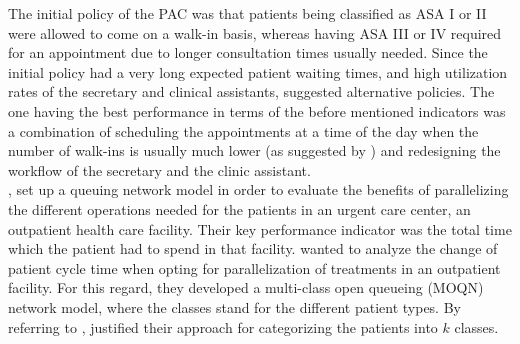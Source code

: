 \documentclass[11pt,a4paper]{article}
\begin{document}
\begin{spacing}{1.8}
The initial policy of the PAC was that patients being classified as ASA I or II were allowed to come on a walk-in basis, whereas having ASA III or IV required for an appointment due to longer consultation times usually needed.
Since the initial policy had a very long expected patient waiting times, and high utilization rates of the secretary and clinical assistants, 
\citet{Zonderland2009} suggested alternative policies. The one having the best performance in terms of the before mentioned indicators was a combination of scheduling the appointments at a time of the day when the number of walk-ins is usually much lower (as suggested by \citep{Rising1973}) and redesigning the workflow of the secretary and the clinic assistant. \\
 \citet{Jiang2007},  set up a queuing network model in order to evaluate the benefits of parallelizing the different operations needed for the patients in an urgent care center, an outpatient health care facility. 
 Their key performance indicator was the total time which the patient had to spend in  that facility. \citet{Jiang2007} wanted to analyze the change of patient cycle time when opting for parallelization of treatments in an outpatient facility. For this regard, they developed a multi-class open queueing (MOQN)  network model, where the classes stand for the different patient types.
By referring to \citep{Harper2002}, \citet{Jiang2007} justified their approach for categorizing the patients into \(k\) classes. 



\end{spacing}
\end{document}

